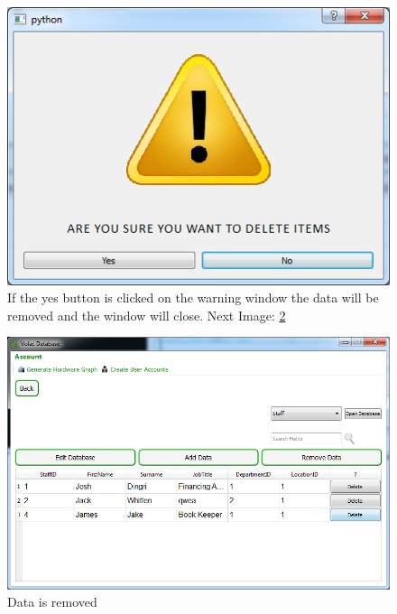 \begin{figure}[H]
    \includegraphics[width=\textwidth]{./Testing/Images/NoButton.png}
    \caption{If the yes button is clicked on the warning window the data will be removed and the window will close. Next Image: \ref{fig:RemovedData}} \label{fig:YesBtn}
\end{figure}

\begin{figure}[H]
    \includegraphics[width=\textwidth]{./Testing/Images/RemovedData.png}
    \caption{Data is removed} \label{fig:RemovedData}
\end{figure}

